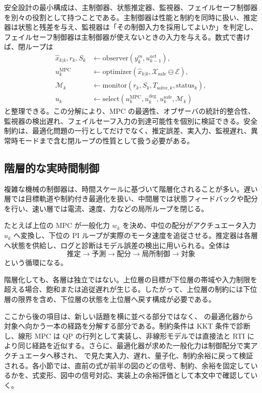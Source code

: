 安全設計の最小構成は、主制御器、状態推定器、監視器、フェイルセーフ制御器を別々の役割として持つことである。主制御器は性能と制約を同時に扱い、推定器は状態と残差を与え、監視器は「その制御入力を採用してよいか」を判定し、フェイルセーフ制御器は主制御器が使えないときの入力を与える。数式で書けば、閉ループは
\begin{align}
  \hat{x}_{k|k},r_k,S_k
  &\leftarrow \mathrm{observer}(y_k^m,u_{k-1}^{act}),\\
  u_k^{\mathrm{MPC}}
  &\leftarrow \mathrm{optimizer}(\hat{x}_{k|k},\mathcal{X}_{\mathrm{safe}}\ominus\mathcal{E}),\\
  \mathcal{M}_k
  &\leftarrow \mathrm{monitor}(r_k,S_k,T_{\mathrm{solve},k},\mathrm{status}_k),\\
  u_k
  &\leftarrow \mathrm{select}(u_k^{\mathrm{MPC}},u_k^{\mathrm{deg}},u_k^{\mathrm{safe}},\mathcal{M}_k)
\end{align}
と整理できる。この分解により、MPC の最適性、オブザーバの統計的整合性、監視器の検出遅れ、フェイルセーフ入力の到達可能性を個別に検証できる。安全制約は、最適化問題の一行としてだけでなく、推定誤差、実入力、監視遅れ、異常時モードまで含む閉ループの性質として扱う必要がある。

\subsection{階層的な実時間制御}

複雑な機械の制御器は、時間スケールに基づいて階層化されることが多い。遅い層では目標軌道や制約付き最適化を扱い、中間層では状態フィードバックや配分を行い、速い層では電流、速度、力などの局所ループを閉じる。

たとえば上位の MPC が一般化力 $w_k$ を決め、中位の配分がアクチュエータ入力 $u_k$ へ変換し、下位の PI ループが実際のモータ速度を追従させる。推定器は各層へ状態を供給し、ログと診断はモデル誤差の検出に用いられる。全体は
\begin{equation}
  \text{推定}\rightarrow \text{予測}\rightarrow \text{配分}\rightarrow \text{局所制御}\rightarrow \text{対象}
\end{equation}
という循環になる。

階層化しても、各層は独立ではない。上位層の目標が下位層の帯域や入力制限を超える場合、飽和または追従遅れが生じる。したがって、上位層の制約には下位層の限界を含め、下位層の状態を上位層へ戻す構成が必要である。

ここから後の項目は、新しい話題を横に並べる部分ではなく、 の最適化器から対象へ向かう一本の経路を分解する部分である。制約条件は KKT 条件で診断し、線形 MPC は QP の行列として実装し、非線形モデルでは直接法と RTI により同じ経路を近似する。さらに、最適化器が求めた一般化力は制御配分で実アクチュエータへ移され、 で見た実入力、遅れ、量子化、制約余裕に戻って検証される。各小節では、直前の式が前半の図のどの信号、制約、余裕を固定しているかを、式変形、図中の信号対応、実装上の余裕評価として本文中で確認していく。
